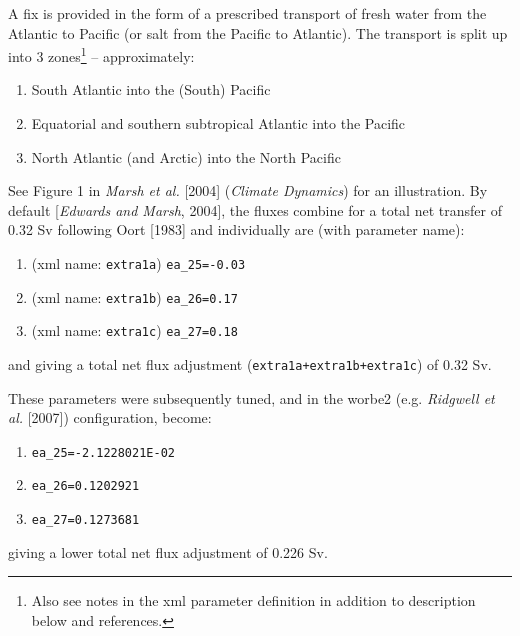 \documentclass[11pt,fleqn]{book} %
\begin{document}
A fix is provided in the form of a prescribed transport of fresh water from the Atlantic to Pacific (or salt from the Pacific to Atlantic). The transport is split up into 3 zones\footnote{Also see notes in the xml parameter definition in addition to description below and references.} -- approximately:

\vspace{1mm}
\begin{enumerate}[noitemsep]
\item South Atlantic into the (South) Pacific
\\\noindent [latitude band \texttt{j=9,12} (\texttt{36x36} grid)]
\item Equatorial and southern subtropical Atlantic into the Pacific
\\\noindent [latitude band \texttt{j=13,25} (\texttt{36x36} grid)]
\item North Atlantic (and Arctic) into the North Pacific
\\\noindent [latitude band \texttt{j=26,36} (\texttt{36x36} grid)]
\end{enumerate}
\vspace{1mm}
See Figure 1 in \textit{Marsh et al.} [2004] (\textit{Climate Dynamics}) for an illustration. By default [\textit{Edwards and Marsh}, 2004], the fluxes combine for a total net transfer of 0.32 Sv following Oort [1983] and individually are (with parameter name):
\vspace{1mm}
\begin{enumerate}[noitemsep]
\item (xml name: \texttt{extra1a}) \texttt{ea\_25=-0.03}
\item (xml name: \texttt{extra1b}) \texttt{ea\_26=0.17}
\item (xml name: \texttt{extra1c}) \texttt{ea\_27=0.18}
\end{enumerate}
\vspace{1mm}
and giving a total net flux adjustment (\texttt{extra1a+extra1b+extra1c}) of 0.32 Sv.

These parameters were subsequently tuned, and in the \textsf{\small worbe2} (e.g. \textit{Ridgwell et al.} [2007]) configuration, become:
\vspace{1mm}
\begin{enumerate}[noitemsep]
\item \texttt{ea\_25=-2.1228021E-02}
\item \texttt{ea\_26=0.1202921}
\item \texttt{ea\_27=0.1273681}
\end{enumerate}
\vspace{1mm}
giving a lower total net flux adjustment of 0.226 Sv.
\end{document}
